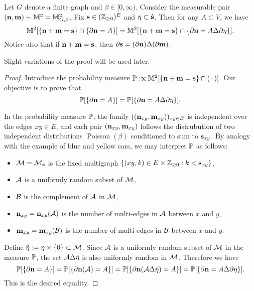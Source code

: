\begin{lemma}
    \label{lem:explicit_switching_lemma}
    Let $G$ denote a finite graph and $\beta\in[0,\infty)$.
    Consider the measurable pair $(\n,\m)\sim \M^2=\M_{G,\beta}^2$.
    Fix $\s\in(\Z_{\geq 0})^E$ and $\eta\subset\hat\s$.
    Then for any $A\subset V$,
    we have
    \[
        \M^2[\{\n+\m=\s\}\cap\{\partial\n=A\}]
        =
        \M^2[\{\n+\m=\s\}\cap\{\partial\n=A\Delta\partial\eta\}].
    \]
    Notice also that if $\n+\m=\s$, then $\partial\s=(\partial\n)\Delta(\partial\m)$.
\end{lemma}

Slight variations of the proof will be used later.

\begin{proof}
    Introduce the probability measure $\P:\propto\M^2[\{\n+\m=\s\}\cap(\blank)]$.
    Our objective is to prove that
    \[
        \P[\{\partial\n=A\}]
        =
        \P[\{\partial\n=A\Delta\partial\eta\}].
    \]

    In the probability measure $\P$, the family $((\n_{xy},\m_{xy}))_{xy\in E}$
    is independent over the edges $xy\in E$,
    and each pair $(\n_{xy},\m_{xy})$ follows the distrubution of two independent 
    distributions $\operatorname{Poisson}(\beta)$ conditioned to sum to $\s_{xy}$.
    By analogy with the example of blue and yellow cars,
    we may interpret $\P$ as follows:
    \begin{itemize}
        \item $\calM=\calM_\s$ is the fixed multigraph $\{(xy,k)\in E\times\Z_{\geq 0}:k<\s_{xy}\}$,
        \item $\calA$ is a uniformly random subset of $\calM$,
        \item $\calB$ is the complement of $\calA$ in $\calM$,
        \item $\n_{xy}=\n_{xy}(\calA)$ is the number of multi-edges in $\calA$ between $x$ and $y$,
        \item $\m_{xy}=\m_{xy}(\calB)$ is the number of multi-edges in $\calB$ between $x$ and $y$.
    \end{itemize}

    Define $\tilde\eta:=\eta\times\{0\}\subset\calM$.
    Since $\calA$ is a uniformly random subset of $\calM$ in the measure $\P$,
    the set $\calA\Delta\tilde\eta$ is also uniformly random in $\calM$.
    Therefore we have
    \[
        \P[\{\partial\n=A\}]=
        \P[\{\partial\n(\calA)=A\}]
        =
        \P[\{\partial\n(\calA\Delta\tilde\eta)=A\}]
        =
        \P[\{\partial\n=A\Delta\partial\eta\}].
    \]
    This is the desired equality.
\end{proof}



